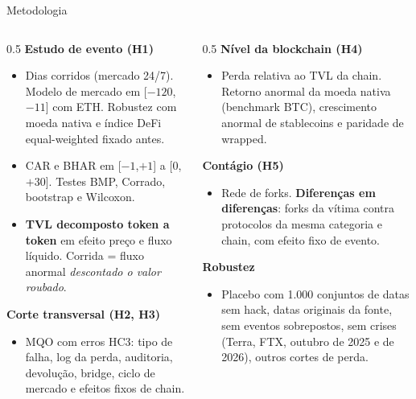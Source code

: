 \documentclass[aspectratio=169,10pt]{beamer}
\begin{document}
\begin{frame}{Metodologia}
\small
\begin{columns}[T]
\begin{column}{0.5\textwidth}
\textbf{Estudo de evento (H1)}
\begin{itemize}\small
\item Dias corridos (mercado 24/7). Modelo de mercado em [$-120$, $-11$] com ETH. Robustez com moeda nativa e índice DeFi equal-weighted fixado antes.
\item CAR e BHAR em [$-1$,$+1$] a [0,$+30$]. Testes BMP, Corrado, bootstrap e Wilcoxon.
\item \textbf{TVL decomposto token a token} em efeito preço e fluxo líquido. Corrida = fluxo anormal \emph{descontado o valor roubado}.
\end{itemize}
\textbf{Corte transversal (H2, H3)}
\begin{itemize}\small
\item MQO com erros HC3: tipo de falha, log da perda, auditoria, devolução, bridge, ciclo de mercado e efeitos fixos de chain.
\end{itemize}
\end{column}
\begin{column}{0.5\textwidth}
\textbf{Nível da blockchain (H4)}
\begin{itemize}\small
\item Perda relativa ao TVL da chain. Retorno anormal da moeda nativa (benchmark BTC), crescimento anormal de stablecoins e paridade de wrapped.
\end{itemize}
\textbf{Contágio (H5)}
\begin{itemize}\small
\item Rede de forks. \textbf{Diferenças em diferenças}: forks da vítima contra protocolos da mesma categoria e chain, com efeito fixo de evento.
\end{itemize}
\textbf{Robustez}
\begin{itemize}\small
\item Placebo com 1.000 conjuntos de datas sem hack, datas originais da fonte, sem eventos sobrepostos, sem crises (Terra, FTX, outubro de 2025 e de 2026), outros cortes de perda.
\end{itemize}
\end{column}
\end{columns}
\end{frame}
\end{document}

